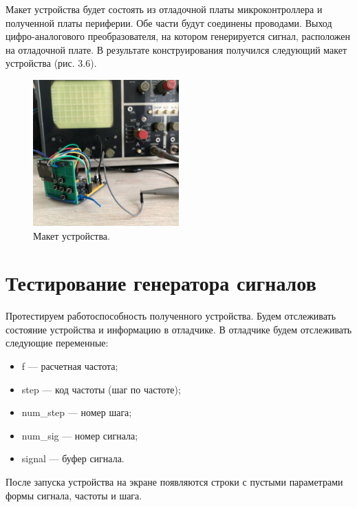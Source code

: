 	Макет устройства будет состоять из отладочной платы микроконтроллера и полученной платы периферии. Обе части будут соединены проводами. Выход цифро-аналогового преобразователя, на котором генерируется сигнал, расположен на отладочной плате. В результате конструирования получился следующий макет устройства (рис. 3.6).

	\begin{figure}[H]
    \centering
    \includegraphics[width=0.5\textwidth]{../image/m2.jpg}
    \caption{Макет устройства.}
	\end{figure}	

\section{Тестирование генератора сигналов}
	
	Протестируем работоспособность полученного устройства. Будем отслеживать состояние устройства и информацию в отладчике. В отладчике будем отслеживать следующие переменные:
	\begin{itemize}
	\item f --- расчетная частота;
	\item step --- код частоты (шаг по частоте);
	\item num\_step --- номер шага;
	\item num\_sig --- номер сигнала;
	\item signal --- буфер сигнала.
	\end{itemize}		
	
	После запуска устройства на экране появляются строки с пустыми параметрами формы сигнала, частоты и шага. 

